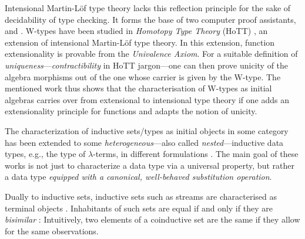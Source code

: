 \documentclass[envcountsame]{llncs}
\begin{document}
%  
 Intensional Martin-L\"of type theory \parencite{martin_lof} lacks this reflection principle for the sake of decidability of type checking. 
 It forms the base of two computer proof assistants, \coq and \agda.
 \textsf{W}-types have been studied \parencite{DBLP:conf/lics/AwodeyGS12} in \emph{Homotopy Type Theory} (HoTT) \parencite{hottbook}, an extension of intensional Martin-L\"of type theory. 
 In this extension, function extensionality is provable from the \emph{Univalence Axiom}. 
 For a suitable definition of \emph{uniqueness}---\emph{contractibility} in HoTT jargon---one can then prove unicity of the
 algebra morphisms out of the one whose carrier is given by the \textsf{W}-type.
 The mentioned work \parencite{DBLP:conf/lics/AwodeyGS12} thus shows that the characterisation of \textsf{W}-types as initial algebras carries over 
 from extensional to intensional type theory if one adds an extensionality principle for functions and adapts the notion of unicity.
 
 
 The characterization of inductive sets/types as initial objects in some category
 has been extended to some \emph{heterogeneous}---also called \emph{nested}---inductive data types, e.g., the type of $\lambda$-terms,
 in different formulations \parencite{fpt, DBLP:journals/iandc/HirschowitzM10}.
 The main goal of these works is not just to characterize a data type via a universal property, but rather a data type
 \emph{equipped with a canonical, well-behaved substitution operation}.
 


 Dually to inductive sets, inductive sets such as streams are characterised as terminal objects \parencite{jacobs1997tutorial}.
 Inhabitants of such sets are equal if and only if they are \emph{bisimilar} \parencite{DBLP:journals/mscs/TuriR98}:
 Intuitively, two elements of a coinductive set are the same if they allow for the same observations.
 
\end{document}
